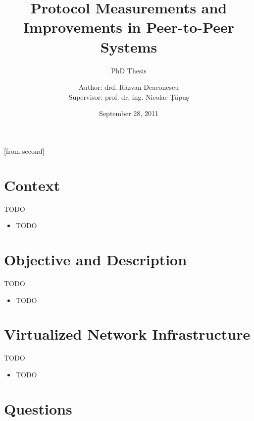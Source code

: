 \documentclass{beamer}
\title[Protocol Measurements and Improvements in Peer-to-Peer
Systems]{Protocol Measurements and Improvements in Peer-to-Peer Systems}
\subtitle{PhD Thesis}
\institute[CSE, ACS, UPB]{University POLITEHNICA of Bucharest}
\author[Răzvan Deaconescu]{Author: drd. Răzvan Deaconescu\\
Supervisor: prof. dr. ing. Nicolae Țăpuș}
\date{September 28, 2011}
\begin{document}
[from second]


\frame{\titlepage}

\section{Context}

\begin{frame}{TODO}
  \begin{itemize}
    \item TODO
  \end{itemize}
\end{frame}

\section{Objective and Description}

\begin{frame}{TODO}
  \begin{itemize}
    \item TODO
  \end{itemize}
\end{frame}

\section{Virtualized Network Infrastructure}

\begin{frame}{TODO}
  \begin{itemize}
    \item TODO
  \end{itemize}
\end{frame}

\section{Questions}
\end{document}
